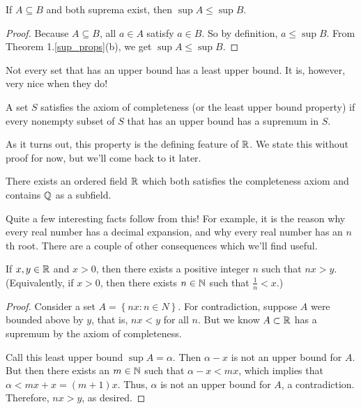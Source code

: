 \documentclass[../m131main.tex]{subfiles}
\begin{document}
\begin{theorem}[]
    If $A \subseteq B$ and both suprema exist, then $\sup A \leq \sup B$.
\end{theorem}

\begin{proof}
    Because $A \subseteq B$, all $a \in A$ satisfy $a \in B$.
    So by definition, $a \leq \sup B$.
    From Theorem 1.\ref{sup_props}(b), we get $\sup A \leq \sup B$.
\end{proof}

Not every set that has an upper bound has a least upper bound.
It is, however, very nice when they do!

\begin{definition}
    A set $S$ satisfies the axiom of completeness (or the least upper bound property) if every nonempty subset of $S$ that has an upper bound has a supremum in $S$.
\end{definition}

As it turns out, this property is the defining feature of $\R$.
We state this without proof for now, but we'll come back to it later.

\begin{theorem}[Completeness of $\R$]
    There exists an ordered field $\R$ which both satisfies the completeness axiom and contains $\mathbb{Q}$ as a subfield.
\end{theorem}

Quite a few interesting facts follow from this!
For example, it is the reason why every real number has a decimal expansion, and why every real number has an $n$th root.
There are a couple of other consequences which we'll find useful.

\begin{theorem}
    If $x,y \in \mathbb{R}$ and $x > 0$, then there exists a positive integer $n$ such that $nx > y$.
    (Equivalently, if $x > 0$, then there exists $n \in \mathbb{N}$ such that $\frac{1}{n} < x$.)
\end{theorem}

\begin{proof}
    Consider a set $A = \left\{ nx : n \in N \right\}$.
    For contradiction, suppose $A$ were bounded above by $y$, that is, $nx < y$ for all $n$.
    But we know $A \subset \mathbb{R}$ has a supremum by the axiom of completeness.

    Call this least upper bound $\sup A = \alpha$.
    Then $\alpha - x$ is not an upper bound for $A$.
    But then there exists an $m \in \mathbb{N}$ such that $\alpha - x < mx$, which implies that $\alpha < mx + x = (m+1)x$.
    Thus, $\alpha$ is not an upper bound for $A$, a contradiction.
    Therefore, $nx > y$, as desired.
\end{proof}
\end{document}
